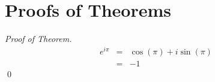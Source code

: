 \chapter{Proofs of Theorems}
\begin{proof}[Proof of Theorem]
\begin{eqnarray}
e^{i\pi} &=& \cos(\pi) + i\sin(\pi)\\
&=& -1
\end{eqnarray} \qed
\end{proof}

